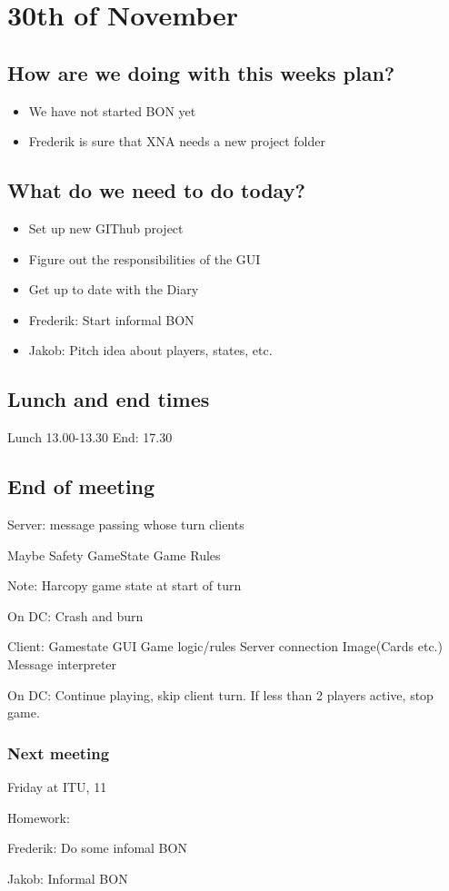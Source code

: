 \section{30th of November}
\subsection{How are we doing with this weeks plan?}
\begin{itemize}
\item  We have not started BON yet
\item Frederik is sure that XNA needs a new project folder
\end{itemize}

\subsection{What do we need to do today?}
\begin{itemize}
\item Set up new GIThub project
\item Figure out the responsibilities of the GUI
\item Get up to date with the Diary
\item Frederik: Start informal BON
\item Jakob: Pitch idea about players, states, etc.
\end{itemize}

\subsection{Lunch and end times}
Lunch
13.00-13.30
End:
17.30
\subsection{End of meeting}
Server:
	message passing
	whose turn
	clients

	Maybe
		Safety GameState
		Game Rules

	Note: Harcopy game state at start of turn
	
	On DC: Crash and burn

Client:
	Gamestate
	GUI
	Game logic/rules
	Server connection
	Image(Cards etc.)
	Message interpreter
	
	On DC: Continue playing, skip client turn. If less than 2 players active, stop game.
\subsubsection{Next meeting}
Friday at ITU, 11

Homework:

Frederik: Do some infomal BON

Jakob: Informal BON
